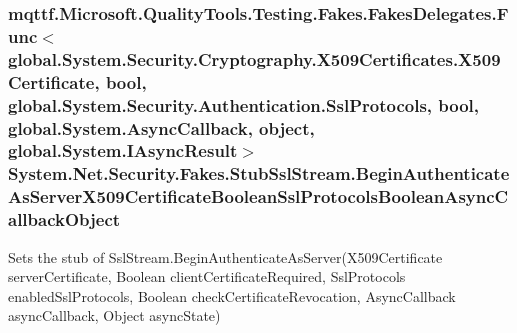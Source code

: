 \hypertarget{class_system_1_1_net_1_1_security_1_1_fakes_1_1_stub_ssl_stream_ac0bc7afedba15db800d9ba107280a9c9}{
\subsubsection[{Begin\-Authenticate\-As\-Server\-X509\-Certificate\-Boolean\-Ssl\-Protocols\-Boolean\-Async\-Callback\-Object}]{\setlength{\rightskip}{0pt plus 5cm}mqttf.\-Microsoft.\-Quality\-Tools.\-Testing.\-Fakes.\-Fakes\-Delegates.\-Func$<$global.\-System.\-Security.\-Cryptography.\-X509\-Certificates.\-X509\-Certificate, bool, global.\-System.\-Security.\-Authentication.\-Ssl\-Protocols, bool, global.\-System.\-Async\-Callback, object, global.\-System.\-I\-Async\-Result$>$ System.\-Net.\-Security.\-Fakes.\-Stub\-Ssl\-Stream.\-Begin\-Authenticate\-As\-Server\-X509\-Certificate\-Boolean\-Ssl\-Protocols\-Boolean\-Async\-Callback\-Object}}\label{class_system_1_1_net_1_1_security_1_1_fakes_1_1_stub_ssl_stream_ac0bc7afedba15db800d9ba107280a9c9}


Sets the stub of Ssl\-Stream.\-Begin\-Authenticate\-As\-Server(\-X509\-Certificate server\-Certificate, Boolean client\-Certificate\-Required, Ssl\-Protocols enabled\-Ssl\-Protocols, Boolean check\-Certificate\-Revocation, Async\-Callback async\-Callback, Object async\-State)


